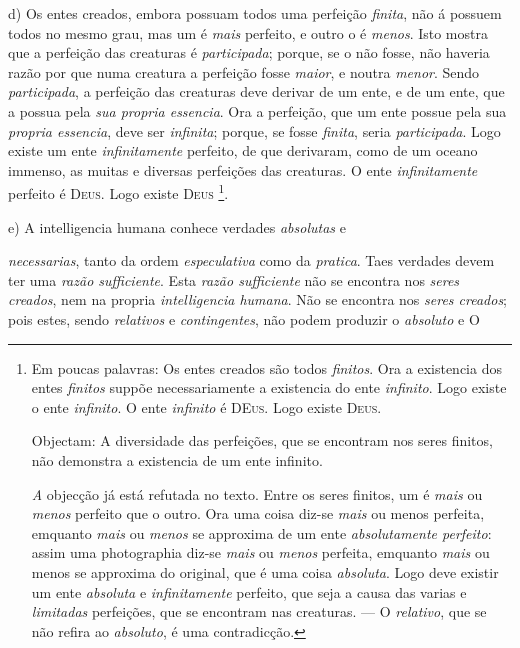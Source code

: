  d) Os entes creados, embora possuam todos uma perfeição \emph{finita}, não á possuem todos no mesmo grau, mas um é \emph{mais} perfeito, e outro o é \emph{menos}. Isto mostra que a perfeição das creaturas é \emph{participada}; porque, se o não fosse, não haveria razão por que numa creatura a perfeição fosse \emph{maior}, e noutra \emph{menor}. Sendo \emph{participada}, a perfeição das creaturas deve derivar de um ente, e de um ente, que a possua pela \emph{sua propria essencia}. Ora a perfeição, que um ente possue pela sua \emph{propria essencia}, deve ser \emph{infinita}; porque, se fosse \emph{finita}, seria \emph{participada}. Logo existe um ente \emph{infinitamente} perfeito, de que derivaram, como de um oceano immenso, as muitas e diversas perfeições das creaturas. O ente \emph{infinitamente} perfeito é \textsc{Deus}. Logo existe \textsc{Deus} \footnote{Em poucas palavras: Os entes creados são todos \emph{finitos}. Ora a existencia dos entes \emph{finitos} suppõe necessariamente a existencia do ente \emph{infinito}. Logo existe o ente \emph{infinito}. O ente \emph{infinito} é \textsc{DEus}. Logo existe \textsc{Deus}.\par Objectam: A diversidade das perfeições, que se encontram nos seres finitos, não demonstra a existencia de um ente infinito.\par \emph{A} objecção já está refutada no texto. Entre os seres finitos, um é \emph{mais} ou \emph{menos} perfeito que o outro. Ora uma coisa diz-se \emph{mais} ou menos perfeita, emquanto \emph{mais} ou \emph{menos} se approxima de um ente \emph{absolutamente perfeito}: assim uma photographia diz-se \emph{mais} ou \emph{menos} perfeita, emquanto \emph{mais} ou menos se approxima do original, que é uma coisa \emph{absoluta}. Logo deve existir um ente \emph{absoluta} e \emph{infinitamente} perfeito, que seja a causa das varias e \emph{limitadas} perfeições, que se encontram nas creaturas. --- O \emph{relativo}, que se não refira ao \emph{absoluto}, é uma contradicção.}.

e) A intelligencia humana conhece verdades \emph{absolutas} e

\emph{necessarias}, tanto da ordem \emph{especulativa} como da \emph{pratica}. Taes verdades devem ter uma \emph{razão sufficiente}. Esta \emph{razão sufficiente} não se encontra nos \emph{seres creados}, nem na propria \emph{intelligencia humana}. Não se encontra nos \emph{seres creados}; pois estes, sendo \emph{relativos} e \emph{contingentes}, não podem produzir o \emph{absoluto} e O 